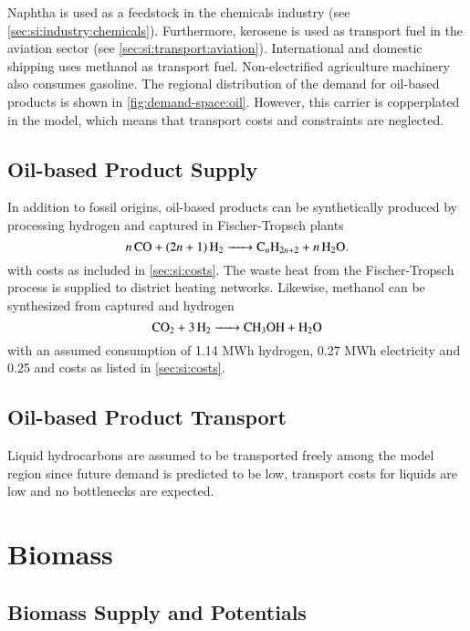 Naphtha is used as a feedstock in the chemicals industry (see
\cref{sec:si:industry:chemicals}). Furthermore, kerosene is used as transport
fuel in the aviation sector (see \cref{sec:si:transport:aviation}). International
and domestic shipping uses methanol as transport fuel.
Non-electrified agriculture machinery also consumes gasoline. The regional
distribution of the demand for oil-based products is shown in
\cref{fig:demand-space:oil}. However, this carrier is copperplated in the model,
which means that transport costs and constraints are neglected.

\subsection{Oil-based Product Supply}
\label{sec:si:oil:supply}

In addition to fossil origins, oil-based products can be synthetically produced
by processing hydrogen and captured \co in Fischer-Tropsch plants
\begin{equation}
    \ce{$n$CO + ($2n$ + 1)H2 -> C_$n$H_{2n+2} + $n$H2O}.
\end{equation}
with costs as included in \cref{sec:si:costs}. The waste heat from the
Fischer-Tropsch process is supplied to district heating networks. Likewise,
methanol can be synthesized from captured \co and hydrogen
\begin{equation}
    \ce{CO2 + 3H2 -> CH3OH + H2O}
\end{equation}
with an assumed consumption of 1.14 MWh hydrogen, 0.27 MWh electricity and
\SI{0.25}{\tco} and costs as listed in \cref{sec:si:costs}.

\subsection{Oil-based Product Transport}
\label{sec:si:oil:transport}

Liquid hydrocarbons are assumed to be transported freely among the model region
since future demand is predicted to be low, transport costs for liquids are low
and no bottlenecks are expected.

\section{Biomass}
\label{sec:si:bio}



\subsection{Biomass Supply and Potentials}
\label{sec:si:bio:potentials}

